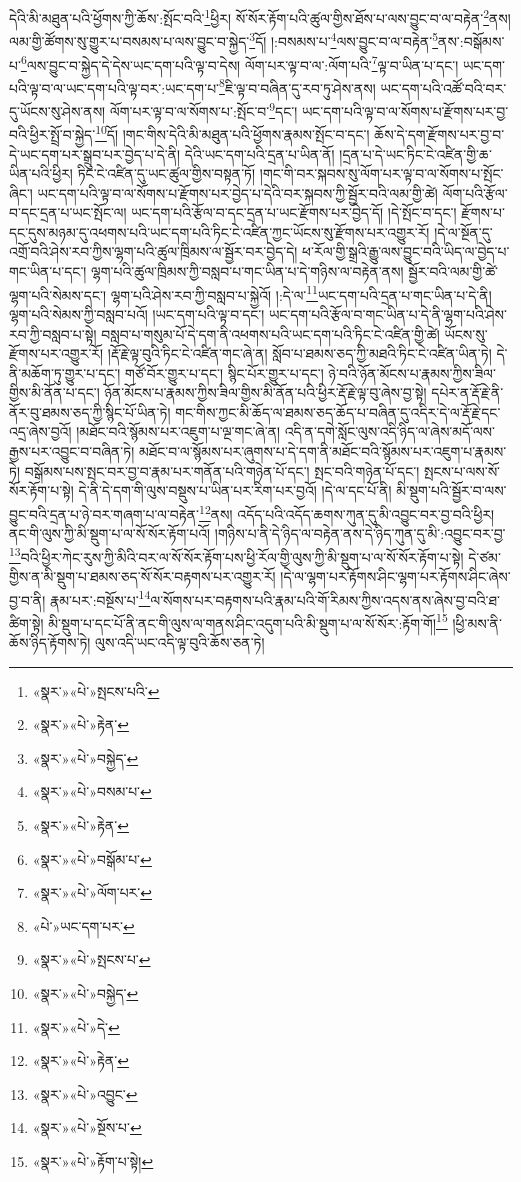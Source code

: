 དེའི་མི་མཐུན་པའི་ཕྱོགས་ཀྱི་ཆོས་:སྤོང་བའི་\footnote{«སྣར་»«པེ་»སྤངས་པའི་}ཕྱིར། སོ་སོར་རྟོག་པའི་ཚུལ་གྱིས་ཐོས་པ་ལས་བྱུང་བ་ལ་བརྟེན་\footnote{«སྣར་»«པེ་»རྟེན་}ནས། ལམ་གྱི་ཚོགས་སུ་གྱུར་པ་བསམས་པ་ལས་བྱུང་བ་སྐྱེད་\footnote{«སྣར་»«པེ་»བསྐྱེད་}དོ། །:བསམས་པ་\footnote{«སྣར་»«པེ་»བསམ་པ་}ལས་བྱུང་བ་ལ་བརྟེན་\footnote{«སྣར་»«པེ་»རྟེན་}ནས་:བསྒོམས་པ་\footnote{«སྣར་»«པེ་»བསྒོམ་པ་}ལས་བྱུང་བ་སྐྱེད་དེ་དེས་ཡང་དག་པའི་ལྟ་བ་དེས། ལོག་པར་ལྟ་བ་ལ་:ལོག་པའི་\footnote{«སྣར་»«པེ་»ལོག་པར་}ལྟ་བ་ཡིན་པ་དང་། ཡང་དག་པའི་ལྟ་བ་ལ་ཡང་དག་པའི་ལྟ་བར་:ཡང་དག་པ་\footnote{«པེ་»ཡང་དག་པར་}ཇི་ལྟ་བ་བཞིན་དུ་རབ་ཏུ་ཤེས་ནས། ཡང་དག་པའི་འཚོ་བའི་བར་དུ་ཡོངས་སུ་ཤེས་ནས། ལོག་པར་ལྟ་བ་ལ་སོགས་པ་:སྤོང་བ་\footnote{«སྣར་»«པེ་»སྤངས་པ་}དང་། ཡང་དག་པའི་ལྟ་བ་ལ་སོགས་པ་རྫོགས་པར་བྱ་བའི་ཕྱིར་སྤྲོ་བ་སྐྱེད་\footnote{«སྣར་»«པེ་»བསྐྱེད་}དོ། །གང་གིས་དེའི་མི་མཐུན་པའི་ཕྱོགས་རྣམས་སྤོང་བ་དང་། ཆོས་དེ་དག་རྫོགས་པར་བྱ་བ་དེ་ཡང་དག་པར་སྒྲུབ་པར་བྱེད་པ་དེ་ནི། དེའི་ཡང་དག་པའི་དྲན་པ་ཡིན་ནོ། །དྲན་པ་དེ་ཡང་ཏིང་ངེ་འཛིན་གྱི་ཆ་ཡིན་པའི་ཕྱིར། ཏིང་ངེ་འཛིན་དུ་ཡང་ཚུལ་གྱིས་བསྟན་ཏོ། །གང་གི་བར་སྐབས་སུ་ལོག་པར་ལྟ་བ་ལ་སོགས་པ་སྤོང་ཞིང་། ཡང་དག་པའི་ལྟ་བ་ལ་སོགས་པ་རྫོགས་པར་བྱེད་པ་དེའི་བར་སྐབས་ཀྱི་སྦྱོར་བའི་ལམ་གྱི་ཚེ། ལོག་པའི་རྩོལ་བ་དང་དྲན་པ་ཡང་སྤོང་ལ། ཡང་དག་པའི་རྩོལ་བ་དང་དྲན་པ་ཡང་རྫོགས་པར་བྱེད་དོ། །དེ་སྤོང་བ་དང་། རྫོགས་པ་དང་དུས་མཉམ་དུ་འཕགས་པའི་ཡང་དག་པའི་ཏིང་ངེ་འཛིན་ཀྱང་ཡོངས་སུ་རྫོགས་པར་འགྱུར་རོ། །དེ་ལ་སྔོན་དུ་འགྲོ་བའི་ཤེས་རབ་ཀྱིས་ལྷག་པའི་ཚུལ་ཁྲིམས་ལ་སྦྱོར་བར་བྱེད་དེ། ཕ་རོལ་གྱི་སྒྲའི་རྒྱུ་ལས་བྱུང་བའི་ཡིད་ལ་བྱེད་པ་གང་ཡིན་པ་དང་། ལྷག་པའི་ཚུལ་ཁྲིམས་ཀྱི་བསླབ་པ་གང་ཡིན་པ་དེ་གཉིས་ལ་བརྟེན་ནས། སྦྱོར་བའི་ལམ་གྱི་ཚེ་ལྷག་པའི་སེམས་དང་། ལྷག་པའི་ཤེས་རབ་ཀྱི་བསླབ་པ་སྐྱེའོ། །:དེ་ལ་\footnote{«སྣར་»«པེ་»དེ་}ཡང་དག་པའི་དྲན་པ་གང་ཡིན་པ་དེ་ནི། ལྷག་པའི་སེམས་ཀྱི་བསླབ་པའོ། །ཡང་དག་པའི་ལྟ་བ་དང་། ཡང་དག་པའི་རྩོལ་བ་གང་ཡིན་པ་དེ་ནི་ལྷག་པའི་ཤེས་རབ་ཀྱི་བསླབ་པ་སྟེ། བསླབ་པ་གསུམ་པོ་དེ་དག་ནི་འཕགས་པའི་ཡང་དག་པའི་ཏིང་ངེ་འཛིན་གྱི་ཚེ། ཡོངས་སུ་རྫོགས་པར་འགྱུར་རོ། །རྡོ་རྗེ་ལྟ་བུའི་ཏིང་ངེ་འཛིན་གང་ཞེ་ན། སློབ་པ་ཐམས་ཅད་ཀྱི་མཐའི་ཏིང་ངེ་འཛིན་ཡིན་ཏེ། དེ་ནི་མཆོག་ཏུ་གྱུར་པ་དང་། གཙོ་བོར་གྱུར་པ་དང་། སྙིང་པོར་གྱུར་པ་དང་། ཉེ་བའི་ཉོན་མོངས་པ་རྣམས་ཀྱིས་ཟིལ་གྱིས་མི་ནོན་པ་དང་། ཉོན་མོངས་པ་རྣམས་ཀྱིས་ཟིལ་གྱིས་མི་ནོན་པའི་ཕྱིར་རྡོ་རྗེ་ལྟ་བུ་ཞེས་བྱ་སྟེ། དཔེར་ན་རྡོ་རྗེ་ནི་ནོར་བུ་ཐམས་ཅད་ཀྱི་སྙིང་པོ་ཡིན་ཏེ། གང་གིས་ཀྱང་མི་ཆོད་ལ་ཐམས་ཅད་ཆོད་པ་བཞིན་དུ་འདིར་དེ་ལ་རྡོ་རྗེ་དང་འདྲ་ཞེས་བྱའོ། །མཐོང་བའི་སྙོམས་པར་འཇུག་པ་ལྔ་གང་ཞེ་ན། འདི་ན་དགེ་སློང་ལུས་འདི་ཉིད་ལ་ཞེས་མདོ་ལས་རྒྱས་པར་འབྱུང་བ་བཞིན་ཏེ། མཐོང་བ་ལ་སྙོམས་པར་ཞུགས་པ་དེ་དག་ནི་མཐོང་བའི་སྙོམས་པར་འཇུག་པ་རྣམས་ཏེ། བསྒོམས་པས་སྤང་བར་བྱ་བ་རྣམ་པར་གནོན་པའི་གཉེན་པོ་དང་། སྤང་བའི་གཉེན་པོ་དང་། སྤངས་པ་ལས་སོ་སོར་རྟོག་པ་སྟེ། དེ་ནི་དེ་དག་གི་ལུས་བསྡུས་པ་ཡིན་པར་རིག་པར་བྱའོ། །དེ་ལ་དང་པོ་ནི། མི་སྡུག་པའི་སྦྱོར་བ་ལས་བྱུང་བའི་དྲན་པ་ཉེ་བར་གཞག་པ་ལ་བརྟེན་\footnote{«སྣར་»«པེ་»རྟེན་}ནས། འདོད་པའི་འདོད་ཆགས་ཀུན་དུ་མི་འབྱུང་བར་བྱ་བའི་ཕྱིར། ནང་གི་ལུས་ཀྱི་མི་སྡུག་པ་ལ་སོ་སོར་རྟོག་པའོ། །གཉིས་པ་ནི་དེ་ཉིད་ལ་བརྟེན་ནས་དེ་ཉིད་ཀུན་དུ་མི་:འབྱུང་བར་བྱ་\footnote{«སྣར་»«པེ་»འབྱུང་}བའི་ཕྱིར་ཀེང་རུས་ཀྱི་མིའི་བར་ལ་སོ་སོར་རྟོག་པས་ཕྱི་རོལ་གྱི་ལུས་ཀྱི་མི་སྡུག་པ་ལ་སོ་སོར་རྟོག་པ་སྟེ། དེ་ཙམ་གྱིས་ན་མི་སྡུག་པ་ཐམས་ཅད་སོ་སོར་བརྟགས་པར་འགྱུར་རོ། །དེ་ལ་ལྷག་པར་རྟོགས་ཤིང་ལྷག་པར་རྟོགས་ཤིང་ཞེས་བྱ་བ་ནི། རྣམ་པར་:བསྔོས་པ་\footnote{«སྣར་»«པེ་»སྔོས་པ་}ལ་སོགས་པར་བརྟགས་པའི་རྣམ་པའི་གོ་རིམས་ཀྱིས་འདས་ནས་ཞེས་བྱ་བའི་ཐ་ཚིག་སྟེ། མི་སྡུག་པ་དང་པོ་ནི་ནང་གི་ལུས་ལ་གནས་ཤིང་འདུག་པའི་མི་སྡུག་པ་ལ་སོ་སོར་:རྟོག་གོ།\footnote{«སྣར་»«པེ་»རྟོག་པ་སྟེ།} །ཕྱི་མས་ནི་ཆོས་ཉིད་རྟོགས་ཏེ། ལུས་འདི་ཡང་འདི་ལྟ་བུའི་ཆོས་ཅན་ཏེ། 